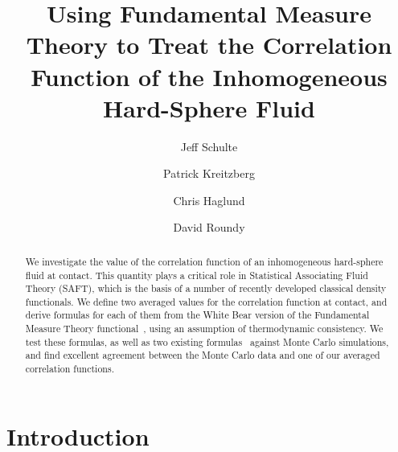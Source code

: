 \documentclass[letterpaper,amsmath,amssymb,10pt,pre]{revtex4-1}
\begin{document}
\title{Using Fundamental Measure Theory to Treat the Correlation
  Function of the Inhomogeneous Hard-Sphere Fluid}

\author{Jeff Schulte}
\author{Patrick Kreitzberg}
\author{Chris Haglund}
\author{David Roundy}


\begin{abstract}
  We investigate the value of the correlation function of an
  inhomogeneous hard-sphere fluid at contact.  This
  quantity plays a critical role in Statistical Associating Fluid
  Theory (SAFT), which is the basis of a number of recently developed classical
  density functionals.  We define two averaged values for the
  correlation function at contact, and derive formulas for each of
  them from the White Bear version of the Fundamental Measure Theory
  functional~\cite{roth2002whitebear}, using an assumption of
  thermodynamic consistency. We test these formulas, as well as two
  existing formulas~\cite{yu2002fmt-dft-inhomogeneous-associating,
    gross2009density} against Monte Carlo simulations, and find
  excellent agreement between the Monte Carlo data and one of our
  averaged correlation functions.
\end{abstract}

\maketitle

\section{Introduction}

\newcommand\saftlocaldft{felipe2001examination, gloor2002saft,%
  gloor2004accurate, clark2006developing, gloor2007prediction,%
  kahl2008modified, gross2009density}
\newcommand\saftnonlocaldft{yu2002fmt-dft-inhomogeneous-associating,%
  fu2005vapor-liquid-dft,bryk2006density}
\end{document}
